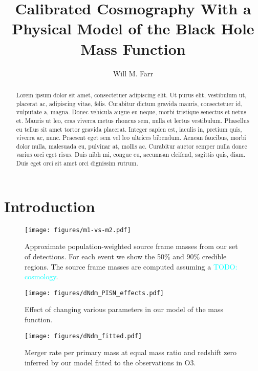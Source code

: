 \documentclass[modern]{aastex631}
\newcommand{\todo}[1]{\textcolor{cyan}{TODO: #1}}
\begin{document}
\title{Calibrated Cosmography With a Physical Model of the Black Hole Mass Function}

\author[0000-0003-1540-8562]{Will M. Farr}

\begin{abstract}
    Lorem ipsum dolor sit amet, consectetuer adipiscing elit. Ut purus elit,
    vestibulum ut, placerat ac, adipiscing vitae, felis. Curabitur dictum
    gravida mauris, consectetuer id, vulputate a, magna. Donec vehicula augue eu
    neque, morbi tristique senectus et netus et. Mauris ut leo, cras viverra
    metus rhoncus sem, nulla et lectus vestibulum. Phasellus eu tellus sit amet
    tortor gravida placerat. Integer sapien est, iaculis in, pretium quis,
    viverra ac, nunc. Praesent eget sem vel leo ultrices bibendum. Aenean
    faucibus, morbi dolor nulla, malesuada eu, pulvinar at, mollis ac. Curabitur
    auctor semper nulla donec varius orci eget risus. Duis nibh mi, congue eu,
    accumsan eleifend, sagittis quis, diam. Duis eget orci sit amet orci
    dignissim rutrum.
\end{abstract}

\section{Introduction}
\label{sec:intro}

\begin{figure}
    \begin{center}
        \texttt{[image: figures/m1-vs-m2.pdf]}
    \end{center}
    \caption{Approximate population-weighted source frame masses from our set of detections.  For each event we show the 50\% and 90\% credible regions.  The source frame masses are computed assuming a \todo{cosmology}.}
    \label{fig:m1-vs-m2}
\end{figure}

\begin{figure}
    \begin{center}
        \texttt{[image: figures/dNdm\_PISN\_effects.pdf]}
    \end{center}
    \caption{Effect of changing various parameters in our model of the mass function.}
    \label{fig:dNdm_PISN_effects}
\end{figure}

\begin{figure}
    \begin{center}
        \texttt{[image: figures/dNdm\_fitted.pdf]}
    \end{center}
    \caption{Merger rate per primary mass at equal mass ratio and redshift zero inferred by our model fitted to the observations in O3.}
    \label{fig:dNdm_fitted}
\end{figure}


\end{document}
